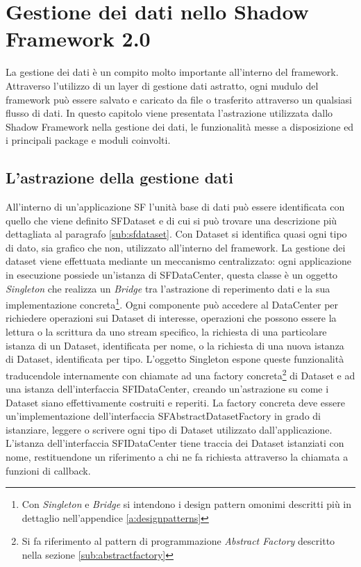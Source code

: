 
\chapter{Gestione dei dati nello Shadow Framework 2.0}
\label{ch:gestionedati}

La gestione dei dati è un compito molto importante all'interno del framework. Attraverso l'utilizzo di un layer di gestione dati astratto, ogni mudulo del framework può essere salvato e caricato da file o trasferito attraverso un qualsiasi flusso di dati.
In questo capitolo viene presentata l'astrazione utilizzata dallo Shadow Framework nella gestione dei dati, le funzionalità messe a disposizione ed i principali package e moduli coinvolti.

\section{L'astrazione della gestione dati}
\label{sec:astrazione}
All'interno di un'applicazione \ac{SF} l'unità base di dati può essere identificata con quello che viene definito SFDataset e di cui si può trovare una descrizione più dettagliata al paragrafo \ref{sub:sfdataset}. Con Dataset si identifica quasi ogni tipo di dato, sia grafico che non, utilizzato all'interno del framework.
La gestione dei dataset viene effettuata mediante un meccanismo centralizzato: ogni applicazione in esecuzione possiede un'istanza di SFDataCenter, questa classe è un oggetto \textit{Singleton} che realizza un \textit{Bridge}
tra l'astrazione di reperimento dati e la sua implementazione concreta\footnote{Con \textit{Singleton} e \textit{Bridge} si intendono i design pattern omonimi descritti più in dettaglio nell'appendice \ref{a:designpatterns}}.
Ogni componente può accedere al DataCenter per richiedere operazioni sui Dataset di interesse, operazioni che possono essere la lettura o la scrittura da uno stream specifico, la richiesta di una particolare istanza di un Dataset, identificata per nome, o la richiesta di una nuova istanza di Dataset, identificata per tipo.
L'oggetto Singleton espone queste funzionalità traducendole internamente con chiamate ad una factory concreta\footnote{Si fa riferimento al pattern di programmazione \textit{Abstract Factory} descritto nella sezione \ref{sub:abstractfactory}}
di Dataset e ad una istanza dell'interfaccia SFIDataCenter, creando un'astrazione su come i Dataset siano effettivamente costruiti e reperiti.
La factory concreta deve essere un'implementazione dell'interfaccia SFAbstractDatasetFactory in grado di istanziare, leggere o scrivere ogni tipo di Dataset utilizzato dall'applicazione.
L'istanza dell'interfaccia SFIDataCenter tiene traccia dei Dataset istanziati con nome, restituendone un riferimento a chi ne fa richiesta attraverso la chiamata a funzioni di callback.


